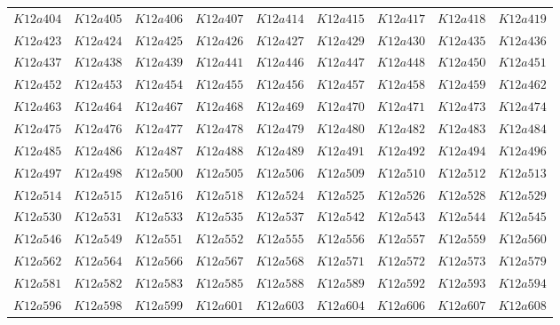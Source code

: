 \documentclass{amsart} %
\theoremstyle{thm}
\theoremstyle{definition}
\numberwithin{equation}{section}
\begin{document}
{\begin{longtable}{@{}lllllllll@{}}
  $K12a404$ &  
  $K12a405$ &  
  $K12a406$ &  
  $K12a407$ &  
  $K12a414$ &  
  $K12a415$ &  
  $K12a417$ &  
  $K12a418$ &  
  $K12a419$ \\   
  $K12a423$ &  
  $K12a424$ &  
  $K12a425$ &  
  $K12a426$ &  
  $K12a427$ &  
  $K12a429$ &  
  $K12a430$ &  
  $K12a435$ &  
  $K12a436$ \\   
  $K12a437$ &  
  $K12a438$ &  
  $K12a439$ &  
  $K12a441$ &  
  $K12a446$ &  
  $K12a447$ &  
  $K12a448$ &  
  $K12a450$ &  
  $K12a451$ \\   
  $K12a452$ &  
  $K12a453$ &  
  $K12a454$ &  
  $K12a455$ &  
  $K12a456$ &  
  $K12a457$ &  
  $K12a458$ &  
  $K12a459$ &  
  $K12a462$ \\   
  $K12a463$ &  
  $K12a464$ &  
  $K12a467$ &  
  $K12a468$ &  
  $K12a469$ &  
  $K12a470$ &  
  $K12a471$ &  
  $K12a473$ &  
  $K12a474$ \\   
  $K12a475$ &  
  $K12a476$ &  
  $K12a477$ &  
  $K12a478$ &  
  $K12a479$ &  
  $K12a480$ &  
  $K12a482$ &  
  $K12a483$ &  
  $K12a484$ \\   
  $K12a485$ &  
  $K12a486$ &  
  $K12a487$ &  
  $K12a488$ &  
  $K12a489$ &  
  $K12a491$ &  
  $K12a492$ &  
  $K12a494$ &  
  $K12a496$ \\   
  $K12a497$ &  
  $K12a498$ &  
  $K12a500$ &  
  $K12a505$ &  
  $K12a506$ &  
  $K12a509$ &  
  $K12a510$ &  
  $K12a512$ &  
  $K12a513$ \\  
  $K12a514$ &  
  $K12a515$ &  
  $K12a516$ &  
  $K12a518$ &  
  $K12a524$ &  
  $K12a525$ &  
  $K12a526$ &  
  $K12a528$ &  
  $K12a529$ \\   
  $K12a530$ &  
  $K12a531$ &  
  $K12a533$ &  
  $K12a535$ &  
  $K12a537$ &  
  $K12a542$ &  
  $K12a543$ &  
  $K12a544$ &  
  $K12a545$ \\   
  $K12a546$ &  
  $K12a549$ &  
  $K12a551$ &  
  $K12a552$ &  
  $K12a555$ &  
  $K12a556$ &  
  $K12a557$ &  
  $K12a559$ &  
  $K12a560$ \\   
  $K12a562$ &  
  $K12a564$ &  
  $K12a566$ &  
  $K12a567$ &  
  $K12a568$ &  
  $K12a571$ &  
  $K12a572$ &  
  $K12a573$ &  
  $K12a579$ \\   
  $K12a581$ &  
  $K12a582$ &  
  $K12a583$ &  
  $K12a585$ &  
  $K12a588$ &  
  $K12a589$ &  
  $K12a592$ &  
  $K12a593$ &  
  $K12a594$ \\   
  $K12a596$ &  
  $K12a598$ &  
  $K12a599$ &  
  $K12a601$ &  
  $K12a603$ &  
  $K12a604$ &  
  $K12a606$ &  
  $K12a607$ &  
  $K12a608$ \\   

\end{longtable}}
\end{document}
